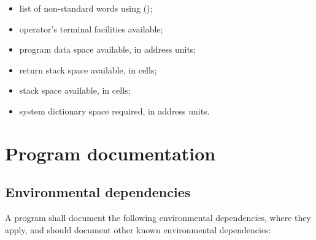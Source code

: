 \begin{itemize}

\item list of non-standard words using 
	();

\item operator's terminal facilities available;

\item program data space available, in address units;

\item return stack space available, in cells;

\item stack space available, in cells;

\item system dictionary space required, in address units.
\end{itemize}



\section{Program documentation} %
\label{doc:program}

\subsection{Environmental dependencies} %

A program shall document the following environmental dependencies,
where they apply, and should document other known environmental
dependencies:

